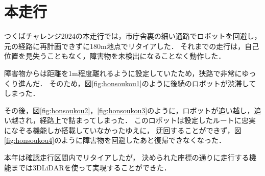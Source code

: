 \section{本走行}
つくばチャレンジ2024の本走行では，市庁舎裏の細い通路でロボットを回避し，元の経路に再計画できずに180m地点でリタイアした．
それまでの走行は，自己位置を見失うこともなく，障害物を未検出になることなく動作した．

障害物からは距離を1m程度離れるように設定していたため，狭路で非常にゆっくり進んだ．
そのため，図\ref{fig:honsoukou1}のように後続のロボットが渋滞してしまった．

その後，図\ref{fig:honsoukou2}，\ref{fig:honsoukou3}のように，ロボットが追い越し，追い越され，経路上で詰まってしまった．
このロボットは設定したルートに忠実になぞる機能しか搭載していなかったゆえに，
迂回することができず，図\ref{fig:honsoukou4}のように障害物を回避したあと復帰できなくなった．

本年は確認走行区間内でリタイアしたが，
決められた座標の通りに走行する機能までは3DLiDARを使って実現することができた．